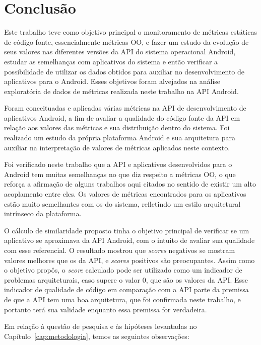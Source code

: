 \chapter{Conclusão}
\label{consideracoes-finais}

Este trabalho teve como objetivo principal o monitoramento de métricas estáticas de código fonte, essencialmente métricas OO, e fazer um estudo da evolução de seus valores nas diferentes versões da API do sistema operacional Android, estudar as semelhanças com aplicativos do sistema e então verificar a possibilidade de utilizar os dados obtidos para auxiliar no desenvolvimento de aplicativos para o Android. Esses objetivos foram alvejados na análise exploratória de dados de métricas realizada neste trabalho na API Android.

Foram conceituadas e aplicadas várias métricas na API de desenvolvimento de aplicativos Android, a fim de avaliar a qualidade do código fonte da API em relação aos valores das métricas e sua distribuição dentro do sistema. Foi realizado um estudo da própria plataforma Android e sua arquitetura para auxiliar na interpretação de valores de métricas aplicados neste contexto. 

Foi verificado neste trabalho que a API e aplicativos desenvolvidos para o Android tem muitas semelhanças no que diz respeito a métricas OO, o que reforça a afirmação de alguns trabalhos aqui citados no sentido de existir um alto acoplamento entre eles. Os valores de métricas encontrados para os aplicativos estão muito semelhantes com os do sistema, refletindo um estilo arquitetural intrínseco da plataforma.

O cálculo de similaridade proposto tinha o objetivo principal de verificar se um aplicativo se aproximava da API Android, com o intuito de avaliar sua qualidade com esse referencial. O resultado mostrou que \textit{scores} negativos se mostram valores melhores que os da API, e \textit{scores} positivos são preocupantes. Assim como o objetivo propôs, o \textit{score} calculado pode ser utilizado como um indicador de problemas arquiteturais, caso supere o valor 0, que são os valores da API. Esse indicador de qualidade de código em comparação com a API parte da premissa de que a API tem uma boa arquitetura, que foi confirmada neste trabalho, e portanto terá sua validade enquanto essa premissa for verdadeira.

Em relação à questão de pesquisa e às hipóteses levantadas no Capítulo~\ref{cap:metodologia}, temos as seguintes observações:

